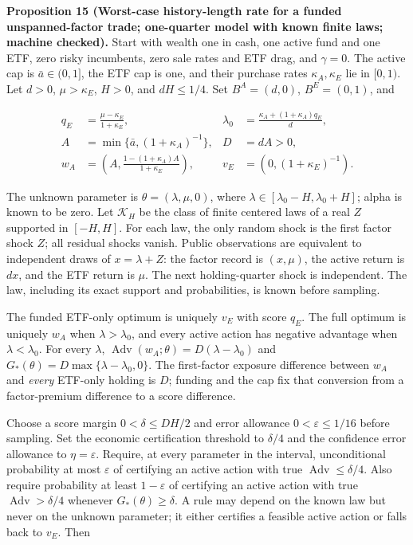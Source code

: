 \documentclass[11pt]{article}
\begin{document}
\label{res:Proposition-15}
\textbf{Proposition 15 (Worst-case history-length rate for a funded unspanned-factor trade; one-quarter model with known finite laws; machine checked).}
Start with wealth one in cash, one active fund and one ETF,
zero risky incumbents, zero sale rates and ETF drag, and
\(\gamma=0\). The active cap is \(\bar a\in(0,1]\), the ETF
cap is one, and their purchase rates
\(\kappa_A,\kappa_E\) lie in \([0,1)\). Let \(d>0\),
\(\mu>\kappa_E\), \(H>0\), and \(dH\leq1/4\). Set
\(B^A=(d,0)\), \(B^E=(0,1)\), and

\begin{equation*}
\begin{aligned}
q_E&=\frac{\mu-\kappa_E}{1+\kappa_E},&
\lambda_0&=\frac{\kappa_A+(1+\kappa_A)q_E}{d},\\
A&=\min\{\bar a,(1+\kappa_A)^{-1}\},& D&=dA>0,\\
w_A&=\left(A,\frac{1-(1+\kappa_A)A}{1+\kappa_E}\right),&
v_E&=\left(0,(1+\kappa_E)^{-1}\right).
\end{aligned}\tag{35}\label{eq:35}
\end{equation*}

The unknown parameter is
\(\theta=(\lambda,\mu,0)\), where
\(\lambda\in[\lambda_0-H,\lambda_0+H]\); alpha is known
to be zero. Let \(\mathcal K_H\) be the class of finite
centered laws of a real \(Z\) supported in \([-H,H]\).
For each law, the only random shock is the first factor shock
\(Z\); all residual shocks vanish. Public observations are equivalent to independent
draws of \(x=\lambda+Z\): the factor record is \((x,\mu)\),
the active return is \(dx\), and the ETF return is \(\mu\).
The next holding-quarter shock is independent. The law,
including its exact support and probabilities, is known before
sampling.

The funded ETF-only optimum is uniquely \(v_E\) with score
\(q_E\). The full optimum is uniquely \(w_A\) when
\(\lambda>\lambda_0\), and every active action has negative
advantage when \(\lambda<\lambda_0\). For every \(\lambda\),
\(\operatorname{Adv}(w_A;\theta)=D(\lambda-\lambda_0)\)
and \(G_*(\theta)=D\max\{\lambda-\lambda_0,0\}\).
The first-factor exposure difference between \(w_A\) and
\emph{every} ETF-only holding is \(D\); funding and the cap fix
that conversion from a factor-premium difference to a score
difference.

Choose a score margin \(0<\delta\leq DH/2\) and error
allowance \(0<\varepsilon\leq1/16\) before sampling. Set the
economic certification threshold to \(\delta/4\) and the
confidence error allowance to \(\eta=\varepsilon\). Require,
at every parameter in the interval, unconditional probability
at most \(\varepsilon\) of certifying an active action with
true \(\operatorname{Adv}\leq\delta/4\). Also require
probability at least \(1-\varepsilon\) of certifying an active
action with true \(\operatorname{Adv}>\delta/4\) whenever
\(G_*(\theta)\geq\delta\). A rule may depend on the known
law but never on the unknown parameter; it either certifies
a feasible active action or falls back to \(v_E\). Then
\end{document}
